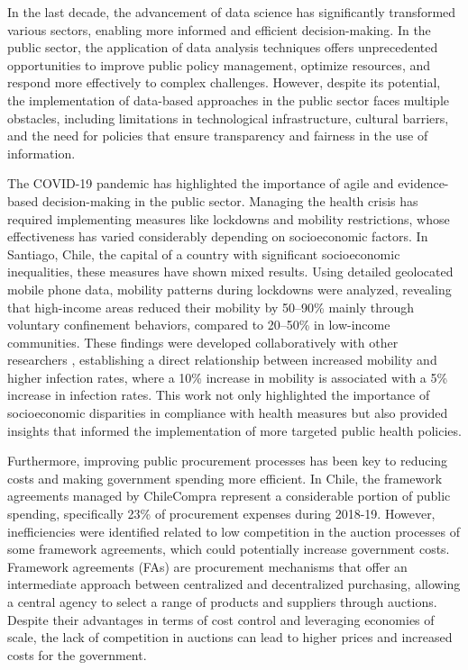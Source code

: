 \begin{intro}

    In the last decade, the advancement of data science has significantly transformed various sectors, enabling more informed and efficient decision-making. In the public sector, the application of data analysis techniques offers unprecedented opportunities to improve public policy management, optimize resources, and respond more effectively to complex challenges. However, despite its potential, the implementation of data-based approaches in the public sector faces multiple obstacles, including limitations in technological infrastructure, cultural barriers, and the need for policies that ensure transparency and fairness in the use of information.
    
    The COVID-19 pandemic has highlighted the importance of agile and evidence-based decision-making in the public sector. Managing the health crisis has required implementing measures like lockdowns and mobility restrictions, whose effectiveness has varied considerably depending on socioeconomic factors. In Santiago, Chile, the capital of a country with significant socioeconomic inequalities, these measures have shown mixed results. Using detailed geolocated mobile phone data, mobility patterns during lockdowns were analyzed, revealing that high-income areas reduced their mobility by 50–90\% mainly through voluntary confinement behaviors, compared to 20–50\% in low-income communities. These findings were developed collaboratively with other researchers \cite{carranza2022social}, establishing a direct relationship between increased mobility and higher infection rates, where a 10\% increase in mobility is associated with a 5\% increase in infection rates. This work not only highlighted the importance of socioeconomic disparities in compliance with health measures but also provided insights that informed the implementation of more targeted public health policies.

    Furthermore, improving public procurement processes has been key to reducing costs and making government spending more efficient. In Chile, the framework agreements managed by ChileCompra represent a considerable portion of public spending, specifically 23\% of procurement expenses during 2018-19. However, inefficiencies were identified related to low competition in the auction processes of some framework agreements, which could potentially increase government costs. Framework agreements (FAs) are procurement mechanisms that offer an intermediate approach between centralized and decentralized purchasing, allowing a central agency to select a range of products and suppliers through auctions. Despite their advantages in terms of cost control and leveraging economies of scale, the lack of competition in auctions can lead to higher prices and increased costs for the government.
    

\end{intro}
